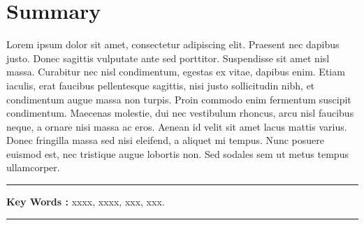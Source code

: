 \chapter*{Summary}


Lorem ipsum dolor sit amet, consectetur adipiscing elit. Praesent nec dapibus justo. Donec sagittis vulputate ante sed porttitor. Suspendisse sit amet nisl massa. Curabitur nec nisl condimentum, egestas ex vitae, dapibus enim. Etiam iaculis, erat faucibus pellentesque sagittis, nisi justo sollicitudin nibh, et condimentum augue massa non turpis. Proin commodo enim fermentum suscipit condimentum. Maecenas molestie, dui nec vestibulum rhoncus, arcu nisl faucibus neque, a ornare nisi massa ac eros. Aenean id velit sit amet lacus mattis varius. Donec fringilla massa sed nisi eleifend, a aliquet mi tempus. Nunc posuere euismod est, nec tristique augue lobortis non. Sed sodales sem ut metus tempus ullamcorper.

\noindent\rule[2pt]{\textwidth}{0.5pt}

{\textbf{Key Words :}}
xxxx, xxxx, xxx, xxx.
\\
\noindent\rule[2pt]{\textwidth}{0.5pt}
